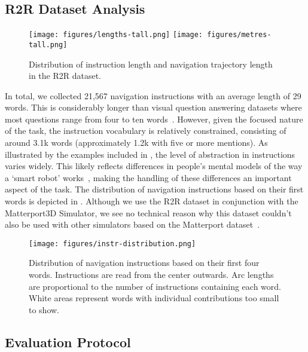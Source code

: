 \documentclass[10pt,twocolumn,letterpaper]{article}
\begin{document}
\subsection{R2R Dataset Analysis}
\label{sec:analysis}


\begin{figure}[t]
	\begin{center}
		\texttt{[image: figures/lengths-tall.png]}
		\texttt{[image: figures/metres-tall.png]}
	\end{center}
	\caption{Distribution of instruction length and navigation trajectory length in the R2R dataset.}
	\label{fig:lengths}
\end{figure}

In total, we collected 21,567 navigation instructions with an average length of 29 words. This is considerably longer than visual question answering datasets where most questions range from four to ten words~\cite{VQA}. However, given the focused nature of the task, the instruction vocabulary is relatively constrained, consisting of around 3.1k words (approximately 1.2k with five or more mentions). As illustrated by the examples included in , the level of abstraction in instructions varies widely. This likely reflects differences in people's mental models of the way a `smart robot' works~\cite{Norman:2002}, making the handling of these differences an important aspect of the task. The distribution of navigation instructions based on their first words is depicted in . Although we use the R2R dataset in conjunction with the Matterport3D Simulator, we see no technical reason why this dataset couldn't also be used with other simulators based on the Matterport dataset~\cite{Matterport3D}.


\begin{figure}[t]
	\begin{center}
		\texttt{[image: figures/instr-distribution.png]}
	\end{center}
	\caption{Distribution of navigation instructions based on their first four words. Instructions are read from the center outwards. Arc lengths are proportional to the number of instructions containing each word. White areas represent words with individual contributions too small to show.}
	\label{fig:distribution}
\end{figure}


\subsection{Evaluation Protocol}
\label{sec:evaluation}
\end{document}
